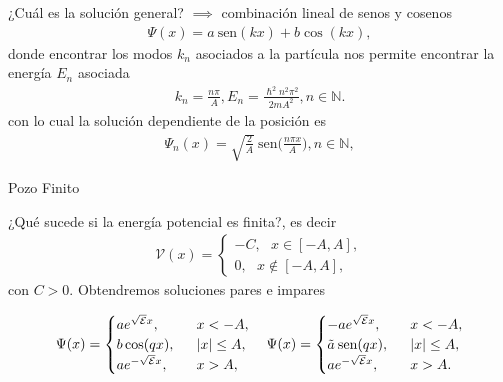\documentclass[aspectratio=1610]{beamer}
\newcommand*{\field}[1]{\mathbb{#1}}
\begin{document}
\begin{frame}{}
\begin{columns}
\column{37em}
\end{columns}

 ¿Cuál es la solución general? $\implies$
 combinación lineal de senos y cosenos
\begin{align*}
    \Psi(x) = a\:\text{sen}(kx) + b\cos(kx),
\end{align*}   
donde encontrar los modos $k_{n}$ asociados a la partícula nos permite encontrar la energía $E_{n}$ asociada
\begin{align*}
    k_{n}=\frac{n\pi}{A}, E_{n} = \frac{\hslash^2n^2\pi^2}{2mA^2}, n \in \field{N}.
\end{align*}
con lo cual la solución dependiente de la posición es
\begin{align}
    \Psi_{n}(x) = \sqrt{\frac{2}{A}}\:\text{sen} \bigg(\frac{n\pi x}{A}\bigg), n \in \field{N},
    \label{eq:PsiPI}
\end{align}
    
\end{frame}


\begin{frame}{Pozo Finito}
  
¿Qué sucede si la energía potencial es finita?, es decir 
\begin{align}
        \mathcal{V}(x) = 
        \left\{ \begin{array}{ll}
        -C, \:\:\:  x \in [-A,A],
        \\
        0, \:\:\: x \notin [-A,A],
        \end{array}
        \right.
        \label{eq:PotencialFinito}
\end{align}
con $C > 0$. Obtendremos soluciones pares e impares 

\begin{equation*}
\Psi(x) =  \begin{cases}
             ae^{\sqrt{\mathcal{E}}x},& \:\:\:  x < -A, \\
             b\cos(qx), & \:\:\: |x| \leq A, \\
             ae^{-\sqrt{\mathcal{E}}x},& \:\:\: x > A,
       \end{cases} \quad
\Psi(x) =  \begin{cases}
        -ae^{\sqrt{\mathcal{E}}x},& \:\:\:  x < -A, \\
        \Tilde{a}\:\text{sen}(qx), & \:\:\: |x| \leq A, \\
        ae^{-\sqrt{\mathcal{E}}x},& \:\:\: x > A.
       \end{cases}
\end{equation*}
    
\begin{columns}
\column{37em}
\end{columns}
\end{frame}
\end{document}
